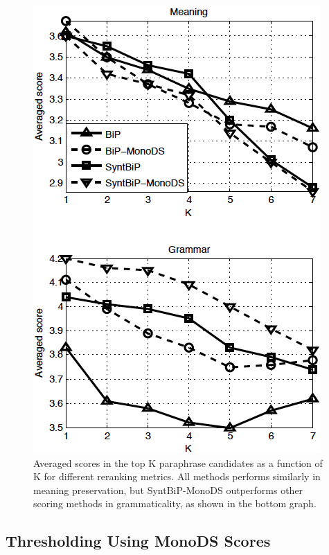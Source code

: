 \documentclass[11pt]{article}
\newcommand{\mnote}[1]{\marginpar{\raggedleft\footnotesize\itshape#1}}
\begin{document}
\begin{figure}
\begin{center}
\includegraphics[width=0.78\linewidth]{meanTopK_vertical_LW2_MS8_2} %
\end{center}
\caption{\small Averaged scores in the top K paraphrase candidates as a function of K for different reranking metrics. All methods performs similarly in meaning preservation, but SyntBiP-MonoDS outperforms other scoring methods in grammaticality, as shown in the bottom graph.}
\label{fig_meanTopK}
\end{figure}

\vspace{-.1cm}
\subsection{Thresholding Using MonoDS Scores}
\vspace{-.1cm}
\end{document}
